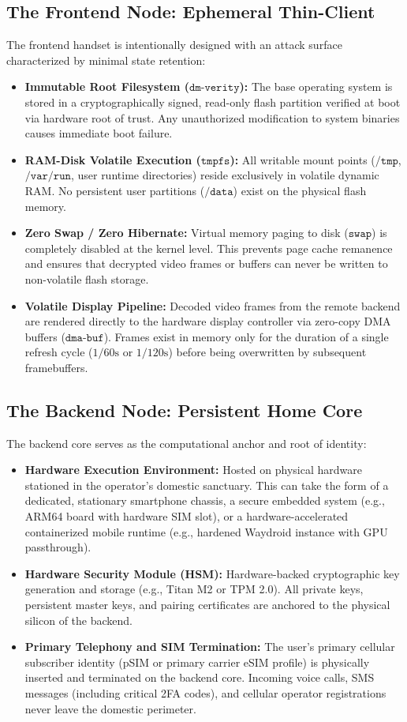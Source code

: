 \subsection{The Frontend Node: Ephemeral Thin-Client}
The frontend handset is intentionally designed with an attack surface characterized by minimal state retention:
\begin{itemize}
    \item \textbf{Immutable Root Filesystem ($\texttt{dm-verity}$):} The base operating system is stored in a cryptographically signed, read-only flash partition verified at boot via hardware root of trust. Any unauthorized modification to system binaries causes immediate boot failure.
    \item \textbf{RAM-Disk Volatile Execution ($\texttt{tmpfs}$):} All writable mount points ($\texttt{/tmp}$, $\texttt{/var/run}$, user runtime directories) reside exclusively in volatile dynamic RAM. No persistent user partitions ($\texttt{/data}$) exist on the physical flash memory.
    \item \textbf{Zero Swap / Zero Hibernate:} Virtual memory paging to disk ($\texttt{swap}$) is completely disabled at the kernel level. This prevents page cache remanence and ensures that decrypted video frames or buffers can never be written to non-volatile flash storage.
    \item \textbf{Volatile Display Pipeline:} Decoded video frames from the remote backend are rendered directly to the hardware display controller via zero-copy DMA buffers ($\texttt{dma-buf}$). Frames exist in memory only for the duration of a single refresh cycle ($1/60\text{s}$ or $1/120\text{s}$) before being overwritten by subsequent framebuffers.
\end{itemize}

\subsection{The Backend Node: Persistent Home Core}
The backend core serves as the computational anchor and root of identity:
\begin{itemize}
    \item \textbf{Hardware Execution Environment:} Hosted on physical hardware stationed in the operator's domestic sanctuary. This can take the form of a dedicated, stationary smartphone chassis, a secure embedded system (e.g., ARM64 board with hardware SIM slot), or a hardware-accelerated containerized mobile runtime (e.g., hardened Waydroid instance with GPU passthrough).
    \item \textbf{Hardware Security Module (HSM):} Hardware-backed cryptographic key generation and storage (e.g., Titan M2 or TPM 2.0). All private keys, persistent master keys, and pairing certificates are anchored to the physical silicon of the backend.
    \item \textbf{Primary Telephony and SIM Termination:} The user's primary cellular subscriber identity (pSIM or primary carrier eSIM profile) is physically inserted and terminated on the backend core. Incoming voice calls, SMS messages (including critical 2FA codes), and cellular operator registrations never leave the domestic perimeter.
\end{itemize}

